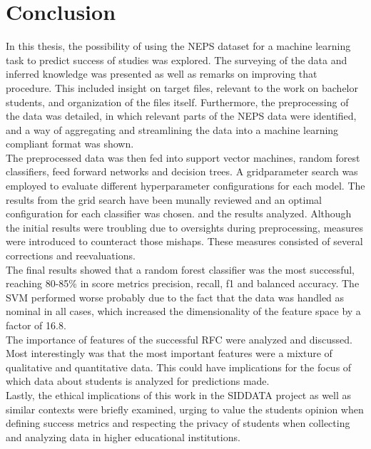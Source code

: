 
\section{Conclusion}
In this thesis, the possibility of using the NEPS dataset for a machine learning task to predict success of studies was explored. The surveying of the data and inferred knowledge was presented as well as remarks on improving that procedure. This included insight on target files, relevant to the work on bachelor students, and organization of the files itself. Furthermore, the preprocessing of the data was detailed, in which relevant parts of the NEPS data were identified, and a way of aggregating and streamlining the data into a machine learning compliant format was shown.\\
The preprocessed data was then fed into support vector machines, random forest classifiers, feed forward networks and decision trees. A gridparameter search was employed to evaluate different hyperparameter configurations for each model. The results from the grid search have been munally reviewed and an optimal configuration for each classifier was chosen. and the results analyzed. Although the initial results were troubling due to oversights during preprocessing, measures were introduced to counteract those mishaps. These measures consisted of several corrections and reevaluations.\\
The final results showed that a random forest classifier was the most successful, reaching 80-85\% in score metrics precision, recall, f1 and balanced accuracy. The SVM performed worse probably due to the fact that the data was handled as nominal in all cases, which increased the dimensionality of the feature space by a factor of 16.8.\\
The importance of features of the successful RFC were analyzed and discussed. Most interestingly was that the most important features were a mixture of qualitative and quantitative data. This could have implications for the focus of which data about students is analyzed for predictions made.\\
Lastly, the ethical implications of this work in the SIDDATA project as well as similar contexts were briefly examined, urging to value the students opinion when defining success metrics and respecting the privacy of students when collecting and analyzing data in higher educational institutions.